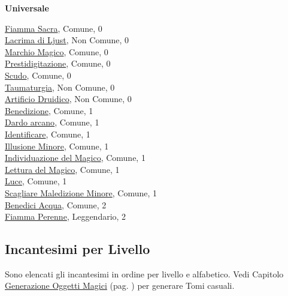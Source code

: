 \begin{multicols}{3}
{{\medskip\textbf{Universale}

\hyperlink{Fiamma Sacra}{Fiamma Sacra}, Comune, 0\\
\hyperlink{Lacrima di Ljust}{Lacrima di Ljust}, Non Comune, 0\\
\hyperlink{Marchio Magico}{Marchio Magico}, Comune, 0\\
\hyperlink{Prestidigitazione}{Prestidigitazione}, Comune, 0\\
\hyperlink{Scudo}{Scudo}, Comune, 0\\
\hyperlink{Taumaturgia}{Taumaturgia}, Non Comune, 0\\
\hyperlink{Artificio Druidico}{Artificio Druidico}, Non Comune, 0\\
\hyperlink{Benedizione}{Benedizione}, Comune, 1\\
\hyperlink{Dardo arcano}{Dardo arcano}, Comune, 1\\
\hyperlink{Identificare}{Identificare}, Comune, 1\\
\hyperlink{Illusione Minore}{Illusione Minore}, Comune, 1\\
\hyperlink{Individuazione del Magico}{Individuazione del Magico}, Comune, 1\\
\hyperlink{Lettura del Magico}{Lettura del Magico}, Comune, 1\\
\hyperlink{Luce}{Luce}, Comune, 1\\
\hyperlink{Scagliare Maledizione Minore}{Scagliare Maledizione Minore}, Comune, 1\\
\hyperlink{Benedici Acqua}{Benedici Acqua}, Comune, 2\\
\hyperlink{Fiamma Perenne}{Fiamma Perenne}, Leggendario, 2
}}

\end{multicols}

\subsection{Incantesimi per Livello}\hypertarget{elencoinc}{}

Sono elencati gli incantesimi in ordine per livello e alfabetico. Vedi Capitolo \hyperlink{CPergamene}{Generazione Oggetti Magici} (pag. \pageref{CPergamene}) per generare Tomi casuali.

